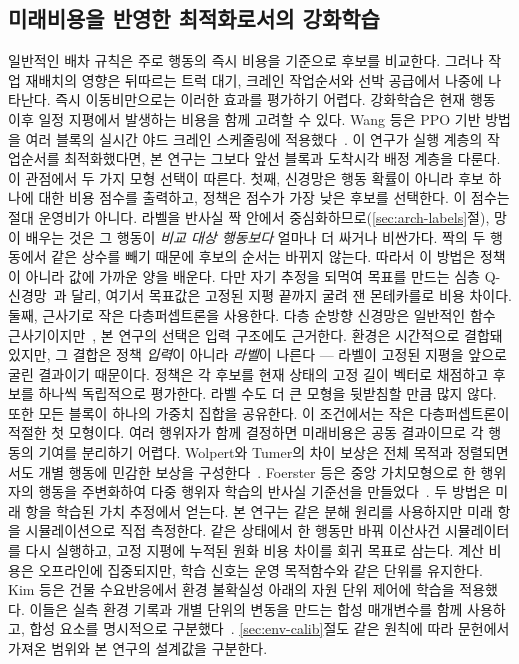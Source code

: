 \documentclass{llncs}
\begin{document}
\subsection{미래비용을 반영한 최적화로서의 강화학습}
\label{sec:rel-rl}
일반적인 배차 규칙은 주로 행동의 즉시 비용을 기준으로 후보를 비교한다. 그러나 작업
재배치의 영향은 뒤따르는 트럭 대기, 크레인 작업순서와 선박 공급에서 나중에 나타난다.
즉시 이동비만으로는 이러한 효과를 평가하기 어렵다. 강화학습은 현재 행동 이후 일정
지평에서 발생하는 비용을 함께 고려할 수 있다. Wang 등은 PPO 기반 방법을 여러 블록의
실시간 야드 크레인 스케줄링에 적용했다~\cite{ref19}. 이 연구가 실행 계층의 작업순서를
최적화했다면, 본 연구는 그보다 앞선 블록과 도착시각 배정 계층을 다룬다.
이 관점에서 두 가지 모형 선택이 따른다. 첫째, 신경망은 행동 확률이 아니라 후보 하나에
대한 비용 점수를 출력하고, 정책은 점수가 가장 낮은 후보를 선택한다. 이 점수는 절대
운영비가 아니다. 라벨을 반사실 짝 안에서 중심화하므로(\ref{sec:arch-labels}절), 망이
배우는 것은 그 행동이 \emph{비교 대상 행동보다} 얼마나 더 싸거나 비싼가다. 짝의 두
행동에서 같은 상수를 빼기 때문에 후보의 순서는 바뀌지 않는다. 따라서 이 방법은 정책이 아니라
값에 가까운 양을 배운다. 다만 자기 추정을 되먹여 목표를 만드는 심층
Q-신경망~\cite{refmnih}과 달리, 여기서 목표값은 고정된 지평 끝까지 굴려 잰
몬테카를로 비용 차이다. 둘째, 근사기로 작은 다층퍼셉트론을 사용한다. 다층 순방향 신경망은
일반적인 함수 근사기이지만~\cite{refhornik}, 본 연구의 선택은 입력 구조에도 근거한다.
환경은 시간적으로 결합돼 있지만, 그 결합은 정책 \emph{입력}이 아니라 \emph{라벨}이
나른다 --- 라벨이 고정된 지평을 앞으로 굴린 결과이기 때문이다. 정책은 각 후보를 현재 상태의
고정 길이 벡터로 채점하고 후보를 하나씩 독립적으로 평가한다. 라벨 수도 더 큰 모형을
뒷받침할 만큼 많지 않다. 또한
모든 블록이 하나의 가중치 집합을 공유한다. 이 조건에서는 작은 다층퍼셉트론이 적절한
첫 모형이다.
여러 행위자가 함께 결정하면 미래비용은 공동 결과이므로 각 행동의 기여를 분리하기
어렵다. Wolpert와 Tumer의 차이 보상은 전체 목적과 정렬되면서도 개별 행동에 민감한
보상을 구성한다~\cite{ref10}. Foerster 등은 중앙 가치모형으로 한 행위자의 행동을
주변화하여 다중 행위자 학습의 반사실 기준선을 만들었다~\cite{ref11}. 두 방법은 미래
항을 학습된 가치 추정에서 얻는다. 본 연구는 같은 분해 원리를 사용하지만 미래 항을
시뮬레이션으로 직접 측정한다. 같은 상태에서 한 행동만 바꿔 이산사건 시뮬레이터를 다시
실행하고, 고정 지평에 누적된 원화 비용 차이를 회귀 목표로 삼는다. 계산 비용은
오프라인에 집중되지만, 학습 신호는 운영 목적함수와 같은 단위를 유지한다.
Kim 등은 건물 수요반응에서 환경 불확실성 아래의 자원 단위 제어에 학습을 적용했다.
이들은 실측 환경 기록과 개별 단위의 변동을 만드는 합성 매개변수를 함께 사용하고,
합성 요소를 명시적으로 구분했다~\cite{ref20}. \ref{sec:env-calib}절도 같은 원칙에 따라
문헌에서 가져온 범위와 본 연구의 설계값을 구분한다.
\end{document}
